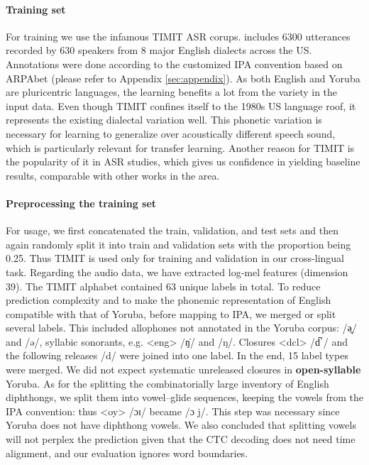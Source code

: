 \documentclass[11pt]{article}
\newcommand{\ipa}[1]{{\ipafont #1}}
\begin{document}
\paragraph{Training set} For training we use the infamous TIMIT ASR corups. \cite{garofolo1993timit} includes 6300 utterances recorded by 630 speakers from 8 major English dialects across the US. Annotations were done according to the customized IPA convention based on ARPAbet \cite{cmudict} (please refer to Appendix \ref{sec:appendix}). As both English and Yoruba are pluricentric languages, the learning benefits a lot from the variety in the input data. Even though TIMIT confines itself to the 1980s US language roof, it represents the existing dialectal variation well. This phonetic variation is necessary for learning to generalize over acoustically different speech sound, which is particularly relevant for transfer learning. Another reason for TIMIT is the popularity of it in ASR studies, which gives us confidence in yielding baseline results, comparable with other works in the area.

\paragraph{Preprocessing the training set} For usage, we first concatenated the train, validation, and test sets and then again randomly split it into train and validation sets with the proportion being 0.25. Thus TIMIT is used only for training and validation in our cross-lingual task. Regarding the audio data, we have extracted log-mel features (dimension 39). The TIMIT alphabet contained 63 unique labels in total. To reduce prediction complexity and to make the phonemic representation of English compatible with that of Yoruba, before mapping to IPA, we merged or split several labels. This included allophones not annotated in the Yoruba corpus: \ipa{<ax-h> /ə̥/} and \ipa{/ə/}, syllabic sonorants, e.g. \ipa{<eng> /ŋ̍/} and \ipa{/ŋ/}. Closures \ipa{<dcl> /d̚ /} and the following releases \ipa{/d/} were joined into one label. In the end, 15 label types were merged. We did not expect systematic unreleased closures in \textbf{open-syllable} Yoruba. \cite{Adesola2024} As for the splitting the combinatorially large inventory of English diphthongs, we split them into vowel--glide sequences, keeping the vowels from the IPA convention: thus \ipa{<oy> /ɔɪ/} became \ipa{<ao y> /ɔ j/}. This step was necessary since Yoruba does not have diphthong vowels. \citet{Przezdziecki2005} We also concluded that splitting vowels will not perplex the prediction given that the CTC decoding does not need time alignment, and our evaluation ignores word boundaries.
\end{document}
